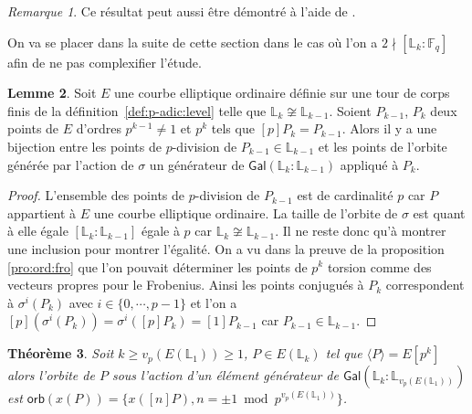 \documentclass[10pt,a4paper]{book}
\theoremstyle{plain}
\newtheorem{thm}{Théorème}[chapter]
\theoremstyle{definition}
\theoremstyle{definition}
\newtheorem{lem}[thm]{Lemme}
\theoremstyle{definition}
\theoremstyle{definition}
\theoremstyle{definition}
\theoremstyle{remark}
\newtheorem{rem}[thm]{Remarque}
\theoremstyle{remark}
\theoremstyle{definition}
\begin{document}
\begin{rem}
Ce résultat peut aussi être démontré à l'aide de \cite[Theorem 4]{Gunji76}.
\end{rem}

On va se placer dans la suite de cette section dans le cas où l'on a $2 \nmid [\mathbb{L}_k:\mathbb{F}_q]$ afin de ne pas complexifier l'étude.

\begin{lem}
\label{lem:bij:ord}
Soit $E$ une courbe elliptique ordinaire définie sur une tour de corps 
finis de la définition~\ref{def:p-adic:level} telle que 
$\mathbb{L}_k \not \cong \mathbb{L}_{k-1}$. Soient $P_{k-1}$, $P_k$ deux points
de $E$ d'ordres $p^{k-1} \neq 1$ et $p^{k}$ tels que $[p]P_{k}=P_{k-1}$. Alors il y a 
une bijection entre les points de $p$-division de $P_{k-1} \in \mathbb{L}_{k-1}$ 
et les points de l'orbite générée par l'action de $\sigma $ un générateur de 
$\mathsf{Gal}(\mathbb{L}_k:\mathbb{L}_{k-1})$ appliqué à $P_{k}$.
\end{lem}

\begin{proof} 
L'ensemble des points de $p$-division de $P_{k-1}$ est de cardinalité $p$ car $P$ appartient à $E$ une courbe elliptique ordinaire. La taille de l'orbite de $\sigma$ est quant à elle égale $[\mathbb{L}_k:\mathbb{L}_{k-1}]$ égale à $p$ car $\mathbb{L}_k \not \cong \mathbb{L}_{k-1}$. Il ne reste donc qu'à montrer une inclusion pour montrer l'égalité. On a vu dans la preuve de la proposition \ref{pro:ord:fro} que l'on pouvait déterminer les points de $p^k$ torsion comme des vecteurs propres pour le Frobenius. Ainsi les points conjugués à $P_k$ correspondent à $\sigma^{i }( P_{k})$ avec $i \in \{0, \cdots , p-1  \}$ et l'on a $[p](\sigma^{i}(P_{k}))=\sigma^{i}([p]P_{k})=[1]P_{k-1}$ car $P_{k-1} \in \mathbb{L}_{k-1}$.
\end{proof}

\begin{thm}
\label{thm:orb:fro}
Soit $k\geqslant  v_p({E(\mathbb{L}_1)}) \geqslant 1$,
 $P \in E(\mathbb{L}_{k})$ tel que $\langle P \rangle =E[p^k]$ 
 alors l'orbite de $P$ sous l'action d'un élément générateur
  de $\mathsf{Gal}(\mathbb{L}_{k}:\mathbb{L}_{v_p({E(\mathbb{L}_1)})})$ est
   $\mathsf{orb}(x(P))=
   \{ x([n]P) , 
   n= \pm 1 \bmod p^{v_p({E(\mathbb{L}_1)})} \}$. 
\end{thm}
\end{document}
